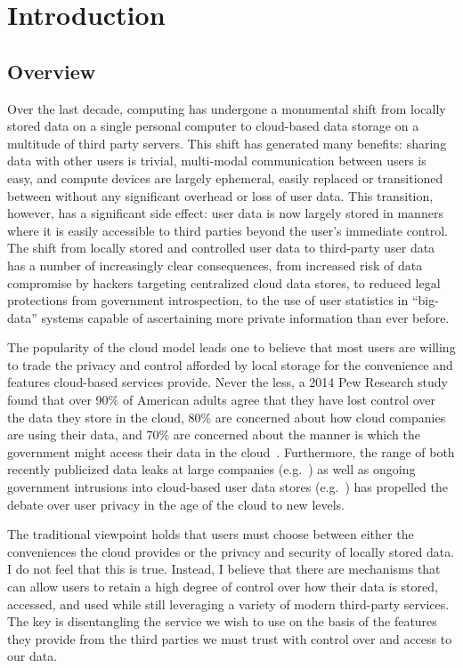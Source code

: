 \chapter{Introduction}
\label{chap:intro}

\section{Overview}

Over the last decade, computing has undergone a monumental shift from
locally stored data on a single personal computer to cloud-based data
storage on a multitude of third party servers. This shift has
generated many benefits: sharing data with other users is trivial,
multi-modal communication between users is easy, and compute devices
are largely ephemeral, easily replaced or transitioned between without
any significant overhead or loss of user data. This transition,
however, has a significant side effect: user data is now largely
stored in manners where it is easily accessible to third parties
beyond the user's immediate control. The shift from locally stored and
controlled user data to third-party user data has a number of
increasingly clear consequences, from increased risk of data
compromise by hackers targeting centralized cloud data stores, to
reduced legal protections from government introspection, to the use of
user statistics in ``big-data'' systems capable of ascertaining more
private information than ever before.

The popularity of the cloud model leads one to believe that most users
are willing to trade the privacy and control afforded by local storage
for the convenience and features cloud-based services provide. Never
the less, a 2014 Pew Research study found that over 90\% of American
adults agree that they have lost control over the data they store in
the cloud, 80\% are concerned about how cloud companies are using
their data, and 70\% are concerned about the manner is which the
government might access their data in the
cloud~\cite{pew-privsec14}. Furthermore, the range of both recently
publicized data leaks at large companies
(e.g.~\cite{apple-icloudleak}) as well as ongoing government
intrusions into cloud-based user data stores
(e.g.~\cite{GreenwaldPrism}) has propelled the debate over user
privacy in the age of the cloud to new levels.

The traditional viewpoint holds that users must choose between either
the conveniences the cloud provides or the privacy and security of
locally stored data. I do not feel that this is true. Instead, I
believe that there are mechanisms that can allow users to retain a
high degree of control over how their data is stored, accessed, and
used while still leveraging a variety of modern third-party
services. The key is disentangling the service we wish to use on the
basis of the features they provide from the third parties we must
trust with control over and access to our data.

